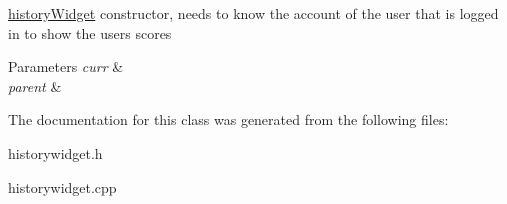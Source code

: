 \hyperlink{classhistoryWidget}{history\+Widget} constructor, needs to know the account of the user that is logged in to show the user\textquotesingle{}s scores 


\begin{DoxyParams}{Parameters}
{\em curr} & \\
\hline
{\em parent} & \\
\hline
\end{DoxyParams}


The documentation for this class was generated from the following files\+:\begin{DoxyCompactItemize}
\item 
historywidget.\+h\item 
historywidget.\+cpp\end{DoxyCompactItemize}
